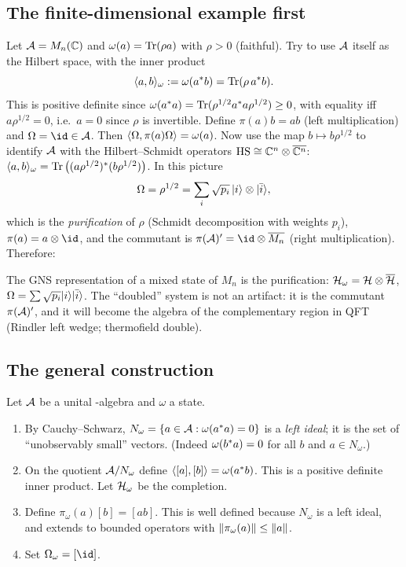 \subsection{The finite-dimensional example first}

Let $\mathcal{A}=M_n(\mathbb{C})$ and $\omega(a)=\operatorname{Tr}(\rho a)$ with $\rho>0$ (faithful). Try to use $\mathcal{A}$ itself as the Hilbert space, with the inner product
\begin{equation}
\langle a,b\rangle_\omega:=\omega(a^{*} b)=\operatorname{Tr}(\rho\,a^{*} b).
\end{equation}
This is positive definite since $\omega(a^{*} a)=\operatorname{Tr}(\rho^{1/2}a^{*} a\rho^{1/2})\ge0$, with equality iff $a\rho^{1/2}=0$, i.e.\ $a=0$ since $\rho$ is invertible. Define $\pi(a)b=ab$ (left multiplication) and $\Omega=\id\in\A$. Then $\langle \Omega,\pi(a)\Omega\rangle=\omega(a)$. Now use the map $b\mapsto b\rho^{1/2}$ to identify $\mathcal{A}$ with the Hilbert--Schmidt operators $\mathrm{HS}\cong\mathbb{C}^n\otimes\overline{\mathbb{C}^n}$: $\langle a,b\rangle_\omega=\operatorname{Tr}\big((a\rho^{1/2})^{*}(b\rho^{1/2})\big)$. In this picture
\begin{equation}
\Omega=\rho^{1/2}=\sum_i\sqrt{p_i}\,\lvert i\rangle\otimes\lvert \bar i\rangle,
\end{equation}
which is the \emph{purification} of $\rho$ (Schmidt decomposition with weights $p_i$), $\pi(a)=a\otimes\id$, and the commutant is $\pi(\A)'=\id\otimes\overline{M_n}$ (right multiplication). Therefore:

\begin{keyidea}
The GNS representation of a mixed state of $M_n$ is the purification: $\mathcal{H}_\omega=\mathcal{H}\otimes\overline{\mathcal{H}}$, $\Omega=\sum\sqrt{p_i}\lvert i\rangle\lvert \bar i\rangle$. The ``doubled'' system is not an artifact: it is the commutant $\pi(\mathcal{A})'$, and it will become the algebra of the complementary region in QFT (Rindler left wedge; thermofield double).
\end{keyidea}

\subsection{The general construction}

Let $\mathcal{A}$ be a unital \cstar-algebra and $\omega$ a state.
\begin{enumerate}
\item By Cauchy--Schwarz, $N_\omega=\{a\in\mathcal{A}:\omega(a^{*} a)=0\}$ is a \emph{left ideal}; it is the set of ``unobservably small'' vectors. (Indeed $\omega(b^{*} a)=0$ for all $b$ and $a\in N_\omega$.)
\item On the quotient $\mathcal{A}/N_\omega$ define $\langle [a],[b]\rangle=\omega(a^{*} b)$. This is a positive definite inner product. Let $\mathcal{H}_\omega$ be the completion.
\item Define $\pi_\omega(a)[b]=[ab]$. This is well defined because $N_\omega$ is a left ideal, and extends to bounded operators with $\lVert \pi_\omega(a)\rVert\le\lVert a\rVert$.
\item Set $\Omega_\omega=[\id]$.
\end{enumerate}

